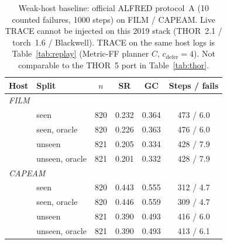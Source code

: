 \begin{table}[t]
\centering
\caption{Weak-host baseline: official ALFRED protocol~A (10 counted failures, 1000 steps) on FILM / CAPEAM.
Live TRACE cannot be injected on this 2019 stack (THOR~2.1 / torch~1.6 / Blackwell).
TRACE on the same host logs is Table~\ref{tab:replay} (Metric-FF planner $C$, $c_{\mathrm{defer}}{=}4$).
Not comparable to the THOR~5 port in Table~\ref{tab:thor}.}
\label{tab:official}
\scriptsize
\setlength{\tabcolsep}{3pt}
\begin{tabular}{llcccc}
\toprule
Host & Split & $n$ & SR & GC & Steps / fails \\
\midrule
\multicolumn{6}{l}{\textit{FILM}}\\
& seen & 820 & 0.232 & 0.364 & 473 / 6.0 \\
& seen, oracle & 820 & 0.226 & 0.363 & 476 / 6.0 \\
& unseen & 821 & 0.205 & 0.334 & 428 / 7.9 \\
& unseen, oracle & 821 & 0.201 & 0.332 & 428 / 7.9 \\
\midrule
\multicolumn{6}{l}{\textit{CAPEAM}}\\
& seen & 820 & 0.443 & 0.555 & 312 / 4.7 \\
& seen, oracle & 820 & 0.446 & 0.559 & 309 / 4.7 \\
& unseen & 821 & 0.390 & 0.493 & 416 / 6.0 \\
& unseen, oracle & 821 & 0.390 & 0.493 & 413 / 6.1 \\
\bottomrule
\end{tabular}
\end{table}
